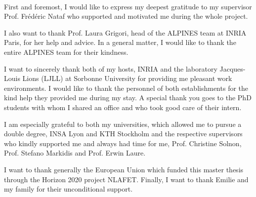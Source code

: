\paragraph{}
First and foremost, I would like to express my deepest gratitude to my supervisor Prof. Frédéric Nataf who supported and motivated me during the whole project.

I also want to thank Prof. Laura Grigori, head of the ALPINES team at INRIA Paris, for her help and advice.
In a general matter, I would like to thank the entire ALPINES team for their kindness.

I want to sincerely thank both of my hosts, INRIA and the laboratory Jacques-Louis Lions (LJLL) at Sorbonne University for providing me pleasant work environments.
I would like to thank the personnel of both establishments for the kind help they provided me during my stay.
A special thank you goes to the PhD students with whom I shared an office and who took good care of their intern.

I am especially grateful to both my universities, which allowed me to pursue a double degree, INSA Lyon and KTH Stockholm and the respective supervisors who kindly supported me and always had time for me, Prof. Christine Solnon, Prof. Stefano Markidis and Prof. Erwin Laure.

I want to thank generally the European Union which funded this master thesis through the Horizon 2020 project NLAFET.
Finally, I want to thank Emilie and my family for their unconditional support.
